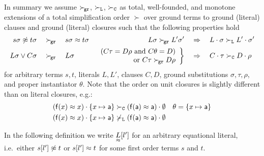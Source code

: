     In summary we assume \( \mathrel\succ_{\!\mathtt{gr}} \), \( \mathrel\succ_{\mathtt{L}} \), \( \mathrel\succ_{\mathtt{C}} \) as
        total, well-founded, and monotone extensions of a
        total simplification order \( \succ \)
        over ground terms to ground (literal) clauses
        and ground (literal) closures
        such that the following properties hold
       \begin{align*}
            s\sigma\not\approx t\sigma \quad&\mathrel\succ_{\!\mathtt{gr}}\quad s\sigma\approx t\sigma
           &
           L\sigma \mathrel\succ_{\!\mathtt{gr}} L'\sigma'
           \quad&\Rightarrow\quad
            L\cdot\sigma \mathrel\succ_{\mathtt{L}} L'\cdot\sigma'
           \\
            L\sigma\lor C\sigma \quad&\mathrel\succ_{\!\mathtt{gr}}\quad L\sigma
       &
       \left.
       \begin{array}{r}
        (C\tau=D\rho\text{ and }C\theta=D)
        \\
        \text{or } C\tau\mathrel\succ_{\!\mathtt{gr}} D\rho
    \end{array}
       \right \}
           \quad&\Rightarrow\quad
            C\cdot\tau\mathrel\succ_{\mathtt{C}}{} D\cdot\rho{}
       \end{align*}
        for arbitrary terms \( s,t \),
        literals \( L, L' \),
        clauses \( C,D \),
        ground substitutions \( \sigma, \tau, \rho \),
        and proper instantiator \( \theta \).
        Note that the order on unit closures is slightly different than on literal closures, e.g.:
       \begin{align*} 
            (\mathsf{f}(x)\approx x)\cdot \{ x\mapsto \mathsf{a} \}
            &\mathrel\succ_{\mathtt{C}}
            (\mathsf{f}(\mathsf{a})\approx\mathsf{a})\cdot\emptyset
            & \theta = \{ x\mapsto \mathsf{a} \}
       \\
        (\mathsf{f}(x)\approx x)\cdot \{ x\mapsto \mathsf{a} \}
        &\not\mathrel\succ_{\mathtt{L}}
        (\mathsf{f}(\mathsf{a})\approx\mathsf{a})\cdot\emptyset
       \end{align*}


   In the following definition we write 
   \( \underset{\approx}{L}[l'] \) 
    for an arbitrary equational literal, i.e.~either
    \( s[l']\not\approx t \) or \( s[l']\approx t \)
        for some first order terms \( s \) and \( t \).

